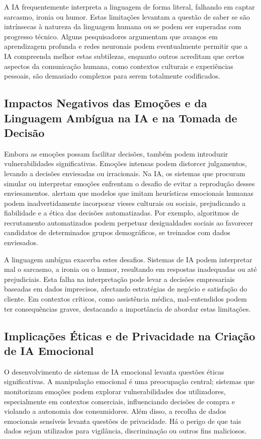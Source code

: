 \documentclass[a4paper,12pt]{report}
\begin{document}
	A IA frequentemente interpreta a linguagem de forma literal, falhando em captar sarcasmo, ironia ou humor. Estas limitações levantam a questão de saber se são intrínsecas à natureza da linguagem humana ou se podem ser superadas com progresso técnico. Alguns pesquisadores argumentam que avanços em aprendizagem profunda e redes neuronais podem eventualmente permitir que a IA compreenda melhor estas subtilezas, enquanto outros acreditam que certos aspectos da comunicação humana, como contextos culturais e experiências pessoais, são demasiado complexos para serem totalmente codificados.
	
	\subsection{Impactos Negativos das Emoções e da Linguagem Ambígua na IA e na Tomada de Decisão}
	
	Embora as emoções possam facilitar decisões, também podem introduzir vulnerabilidades significativas. Emoções intensas podem distorcer julgamentos, levando a decisões enviesadas ou irracionais. Na IA, os sistemas que procuram simular ou interpretar emoções enfrentam o desafio de evitar a reprodução desses enviesamentos. \textcite{russell2020} alertam que modelos que imitam heurísticas emocionais humanas podem inadvertidamente incorporar vieses culturais ou sociais, prejudicando a fiabilidade e a ética das decisões automatizadas. Por exemplo, algoritmos de recrutamento automatizados podem perpetuar desigualdades sociais ao favorecer candidatos de determinados grupos demográficos, se treinados com dados enviesados.
	
	A linguagem ambígua exacerba estes desafios. Sistemas de IA podem interpretar mal o sarcasmo, a ironia ou o humor, resultando em respostas inadequadas ou até prejudiciais. Esta falha na interpretação pode levar a decisões empresariais baseadas em dados imprecisos, afectando estratégias de negócio e satisfação do cliente. Em contextos críticos, como assistência médica, mal-entendidos podem ter consequências graves, destacando a importância de abordar estas limitações.
	
	\subsection{Implicações Éticas e de Privacidade na Criação de IA Emocional}
	
	O desenvolvimento de sistemas de IA emocional levanta questões éticas significativas. A manipulação emocional é uma preocupação central; sistemas que monitorizam emoções podem explorar vulnerabilidades dos utilizadores, especialmente em contextos comerciais, influenciando decisões de compra e violando a autonomia dos consumidores. Além disso, a recolha de dados emocionais sensíveis levanta questões de privacidade. Há o perigo de que tais dados sejam utilizados para vigilância, discriminação ou outros fins maliciosos.
	
\end{document}
